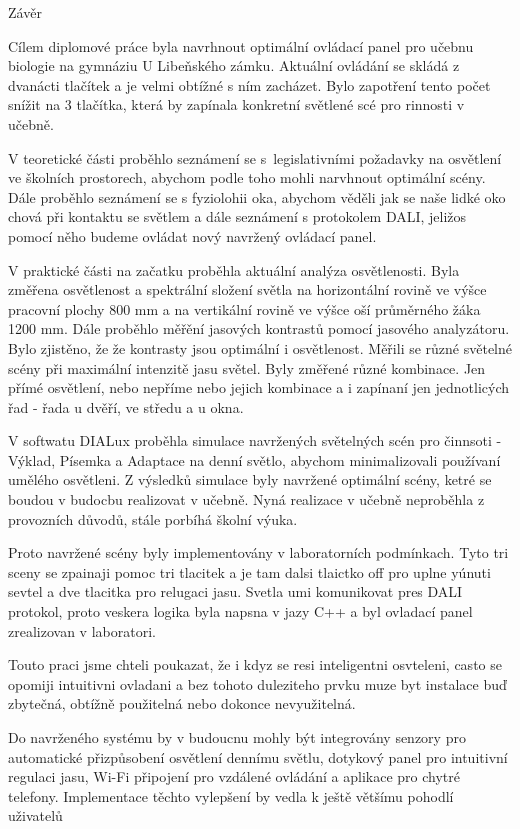 \nonum\chap Závěr

Cílem diplomové práce byla navrhnout optimální ovládací panel pro učebnu biologie na gymnáziu U Libeňského zámku. Aktuální
ovládání se skládá z dvanácti tlačítek a je velmi obtížné s ním zacházet. Bylo zapotření tento počet snížit na 3 tlačítka, 
která by zapínala konkretní světlené scé pro rinnosti v učebně.

V teoretické části proběhlo seznámení se s~legislativními požadavky na osvětlení ve školních prostorech, abychom podle toho mohli
narvhnout optimální scény. Dále proběhlo seznámení se s fyziolohii oka, abychom věděli jak se naše lidké oko chová při kontaktu 
se světlem a dále seznámení s protokolem DALI, jeližos pomocí něho budeme ovládat nový navržený ovládací panel.

V praktické části na začatku proběhla aktuální analýza osvětlenosti. Byla změřena osvětlenost a spektrální složení světla
na horizontální rovině ve výšce pracovní plochy 800 mm a na vertikální rovině ve výšce oší průměrného žáka 1200 mm. Dále proběhlo
měřění jasových kontrastů pomocí jasového analyzátoru. Bylo zjistěno, že že kontrasty jsou optimální i osvětlenost.
Měřili se různé světelné scény při maximální intenzitě jasu světel. Byly změřené různé kombinace. Jen přímé osvětlení, nebo nepříme
nebo jejich kombinace a i zapínaní jen jednotlicých řad - řada u dvěří, ve středu a u okna.

V softwatu DIALux proběhla simulace navržených světelných scén pro činnsoti - Výklad, Písemka a Adaptace na denní světlo, abychom 
minimalizovali používaní umělého osvětleni. Z výsledků simulace byly navržené optimální scény, ketré se boudou v budocbu realizovat v učebně.
Nyná realizace v učebně neproběhla z provozních důvodů, stále porbíhá školní výuka.

Proto navržené scény byly implementovány v laboratorních podmínkach. Tyto tri sceny se zpainaji pomoc tri tlacitek a je tam dalsi tlaictko
off pro uplne yúnuti sevtel a dve tlacitka pro relugaci jasu. Svetla umi komunikovat pres DALI protokol, proto veskera logika byla 
napsna v jazy C++ a byl ovladací panel zrealizovan v laboratori.

Touto praci jsme chteli poukazat, že i kdyz se resi inteligentni osvteleni, casto se opomiji intuitivni ovladani a bez tohoto 
duleziteho prvku muze byt instalace buď zbytečná, obtížně použitelná nebo dokonce nevyužitelná.

Do navrženého systému by v budoucnu mohly být integrovány senzory pro automatické přizpůsobení osvětlení dennímu světlu,
dotykový panel pro intuitivní regulaci jasu, Wi-Fi připojení pro vzdálené ovládání a aplikace pro chytré telefony.
Implementace těchto vylepšení by vedla k ještě většímu pohodlí uživatelů

